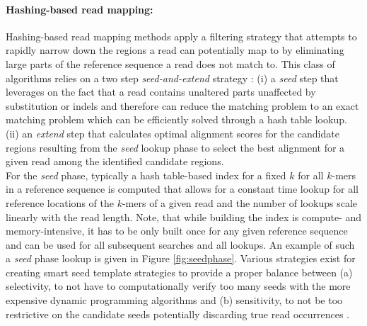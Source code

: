 \paragraph{Hashing-based read mapping:} Hashing-based read mapping methods apply a filtering strategy that attempts to rapidly narrow down the regions a read can potentially map to by eliminating large parts of the reference sequence a read does not match to. This class of algorithms relies on a two step \textit{seed-and-extend} strategy \citep{Canzar2015}: (i) a \textit{seed} step that leverages on the fact that a read contains unaltered parts unaffected by substitution or indels and therefore can reduce the matching problem to an exact matching problem which can be efficiently solved through a hash table lookup. (ii) an \textit{extend} step that calculates optimal alignment scores for the candidate regions resulting from the \textit{seed} lookup phase to select the best alignment for a given read among the identified candidate regions. \\ 
For the \textit{seed} phase, typically a hash table-based index for a fixed $k$ for all $k$-mers in a reference sequence is computed that allows for a constant time lookup for all reference locations of the $k$-mers of a given read and the number of lookups scale linearly with the read length. Note, that while building the index is compute- and memory-intensive, it has to be only built once for any given reference sequence and can be used for all subsequent searches and all lookups. An example of such a \textit{seed} phase lookup is given in Figure \ref{fig:seedphase}. Various strategies exist for creating smart seed template strategies to provide a proper balance between (a) selectivity, to not have to computationally verify too many seeds with the more expensive dynamic programming algorithms and (b) sensitivity, to not be too restrictive on the candidate seeds potentially discarding true read occurrences \citep{Canzar2015}.

